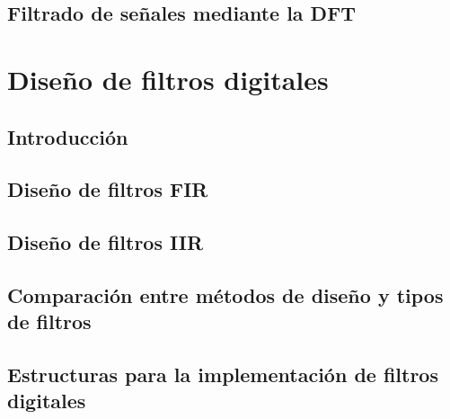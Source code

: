 \documentclass[a4paper]{book}
\begin{document}
\section{Filtrado de señales mediante la DFT}


\chapter{Diseño de filtros digitales}

\section{Introducción}

\section{Diseño de filtros FIR}

\section{Diseño de filtros IIR}

\section{Comparación entre métodos de diseño y tipos de filtros}

\section{Estructuras para la implementación de filtros digitales}



%
\end{document}
